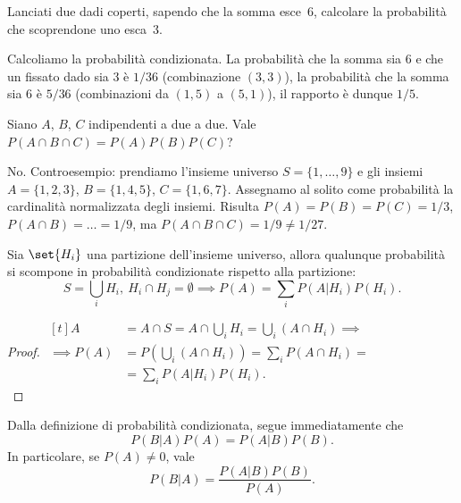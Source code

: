
\begin{exercise}
	Lanciati due dadi coperti, sapendo che la somma esce~6, calcolare la probabilità che scoprendone uno esca~3.
\end{exercise}

\begin{solution}
	Calcoliamo la probabilità condizionata. La probabilità che la somma sia 6 e che un fissato dado sia 3 è $1/36$ (combinazione $(3,3)$), la probabilità che la somma sia 6 è $5/36$ (combinazioni da $(1,5)$ a $(5,1)$), il rapporto è dunque $1/5$.
\end{solution}

\begin{exercise}
	Siano $A$, $B$, $C$ indipendenti a due a due. Vale $P(A\cap B\cap C)=P(A)P(B)P(C)$?
\end{exercise}

\begin{solution}
	No. Controesempio: prendiamo l'insieme universo
	$S = \{1,\dots,9\}$
	e gli insiemi
	$A = \{1, 2, 3\}$,
	$B = \{1, 4, 5\}$,
	$C = \{1, 6, 7\}$.
	Assegnamo al solito come probabilità la cardinalità normalizzata degli insiemi.
	Risulta $P(A)=P(B)=P(C)=1/3$, $P(A\cap B)=\dots=1/9$, ma $P(A\cap B\cap C)=1/9\neq1/27$.
\end{solution}

\begin{theorem}
	Sia $\set{H_i}$ una partizione dell'insieme universo,
	allora qualunque probabilità si scompone in probabilità condizionate rispetto alla partizione:
	\begin{equation*}
		S=\bigcup_iH_i,\ H_i\cap H_j=\emptyset\implies P(A)=\sum_iP(A|H_i)P(H_i).
	\end{equation*}
\end{theorem}

\begin{proof}
	$\begin{aligned}[t]
		A &= A\cap S = A\cap \bigcup_iH_i = \bigcup_i(A\cap H_i) \implies \\
		\implies P(A) &= P\left(\bigcup_i(A\cap H_i)\right) = \sum_i P(A\cap H_i) = \\
		&= \sum_i P(A|H_i)P(H_i).
	\end{aligned}$\vspace{-1em}\\
\end{proof}


\begin{theorem}[di Bayes]
	Dalla definizione di probabilità condizionata, segue immediatamente che
	\begin{equation*}
		P(B|A) P(A) = P(A|B) P(B).
	\end{equation*}
	In particolare, se $P(A)\neq 0$, vale
	\begin{equation*}
		P(B|A) = \frac{P(A|B) P(B)}{P(A)}.
	\end{equation*}
\end{theorem}

